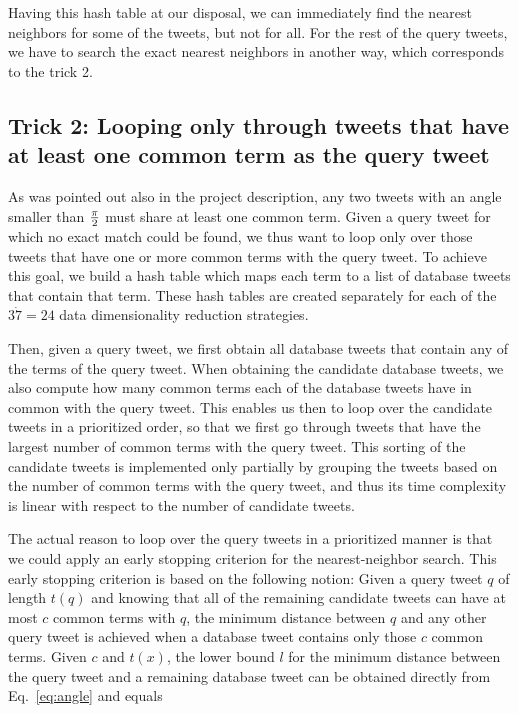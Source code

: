 \documentclass{article}
\begin{document}
Having this hash table at our disposal, we can immediately find the nearest neighbors for some of the tweets, but not for all.
For the rest of the query tweets, we have to search the exact nearest neighbors in another way, which corresponds to the trick 2.

\subsection*{Trick 2: Looping only through tweets that have at least one common term as the query tweet}

As was pointed out also in the project description, any two tweets with an angle smaller than $\pi \over 2$ must share at least one common term.
Given a query tweet for which no exact match could be found, we thus want to loop only over those tweets that have one or more common terms with the query tweet.
To achieve this goal, we build a hash table which maps each term to a list of database tweets that contain that term.
These hash tables are created separately for each of the $3 \dot 7 = 24$ data dimensionality reduction strategies.

Then, given a query tweet, we first obtain all database tweets that contain any of the terms of the query tweet.
When obtaining the candidate database tweets, we also compute how many common terms each of the database tweets have in common with the query tweet.
This enables us then to loop over the candidate tweets in a prioritized order, so that we first go through tweets that have the largest number of common terms with the query tweet.
This sorting of the candidate tweets is implemented only partially by grouping the tweets based on the number of common terms with the query tweet,
and thus its time complexity is linear with respect to the number of candidate tweets.

The actual reason to loop over the query tweets in a prioritized manner is that we could apply an early stopping criterion for the nearest-neighbor search.
This early stopping criterion is based on the following notion: Given a query tweet $q$ of length $t(q)$ and knowing that all of the remaining candidate tweets can have at most $c$ common terms with $q$,
the minimum distance between $q$ and any other query tweet is achieved when a database tweet contains only those $c$ common terms.
Given $c$ and $t(x)$, the lower bound $l$ for the minimum distance between the query tweet and a remaining database tweet can be obtained directly from Eq.~\ref{eq:angle} and equals
\end{document}
